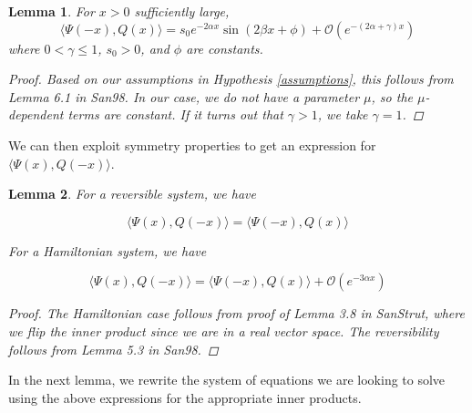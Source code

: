 \documentclass[12pt]{article}
\newtheorem{lemma}{Lemma}
\begin{document}

\begin{lemma}\label{IPform}
For $x > 0$ sufficiently large,
\begin{equation}
\langle \Psi(-x), Q(x) \rangle
= s_0 e^{-2 \alpha x} \sin(2 \beta x + \phi) + \mathcal{O}(e^{-(2 \alpha + \gamma) x})
\end{equation}
where $0 < \gamma \leq 1$, $s_0 > 0$, and $\phi$ are constants.
\begin{proof}
Based on our assumptions in Hypothesis \ref{assumptions}, this follows from Lemma 6.1 in San98. In our case, we do not have a parameter $\mu$, so the $\mu$-dependent terms are constant. If it turns out that $\gamma > 1$, we take $\gamma = 1$.
\end{proof}
\end{lemma}

We can then exploit symmetry properties to get an expression for $\langle \Psi(x), Q(-x) \rangle$.


\begin{lemma}\label{otherIP}
For a reversible system, we have

\begin{equation}
\langle \Psi(x), Q(-x) \rangle = \langle \Psi(-x), Q(x) \rangle
\end{equation}

For a Hamiltonian system, we have

\begin{equation}
\langle \Psi(x), Q(-x) \rangle = \langle \Psi(-x), Q(x) \rangle
+ \mathcal{O}(e^{-3 \alpha x})
\end{equation}

\begin{proof}
The Hamiltonian case follows from proof of Lemma 3.8 in SanStrut, where we flip the inner product since we are in a real vector space. The reversibility follows from Lemma 5.3 in San98.
\end{proof}

\end{lemma}

In the next lemma, we rewrite the system of equations we are looking to solve using the above expressions for the appropriate inner products.

\end{document}
